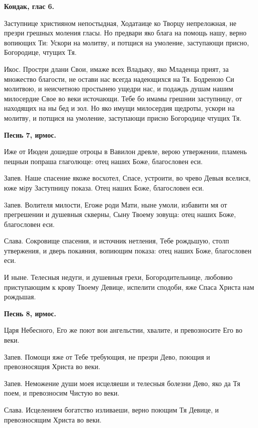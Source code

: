 \medskip


\bfseries Кондак, глас 6.\normalfont{}\nopagebreak


Заступнице християном непостыдная, Ходатаице ко Творцу непреложная, не презри грешных моления гласы. Но предвари яко блага на помощь нашу, верно вопиющих Ти: Ускори на молитву, и потщися на умоление, заступающи присно, Богородице, чтущих Тя.

Икос. Простри длани Свои, имаже всех Владыку, яко Младенца прият, за множество благости, не остави нас всегда надеющихся на Тя. Бодреною Си молитвою, и неисчетною простынею ущедри нас, и подаждь душам нашим милосердие Свое во веки источающи. Тебе бо имамы грешнии заступницу, от находящих на ны бед и зол. Но яко имущи милосердия щедроты, ускори на молитву, и потщися на умоление, заступающи присно Богородице чтущих Тя.


\medskip


\bfseries Песнь 7, ирмос.\normalfont{}\nopagebreak


Иже от Июдеи дошедше отроцы в Вавилон древле, верою утвержении, пламень пещныи попраша глаголюще: отец наших Боже,   благословен еси.

Запев. Наше спасение якоже восхотел, Спасе, устроити, во чрево Девыя вселися, юже мiру Заступницу показа. Отец наших Боже, благословен еси.

3апев. Волителя милости, Егоже роди Мати, ныне умоли, избавити мя от прегрешении и душевныя скверны, Сыну Твоему зовуща: отец наших Боже, благословен еси.

Слава. Сокровище спасения, и источник нетления, Тебе рождьшую, столп утвержения, и дверь покаяния, вопиющим показа: отец наших Боже, благословен еси.

И ныне. Телесныя недуги, и душевныя грехи, Богородительнице, любовию приступающим к крову Твоему Девице, испелити сподоби, яже Спаса Христа нам рождьшая.


\medskip


\bfseries Песнь 8, ирмос.\normalfont{}\nopagebreak


Царя Небесного, Его же поют вои ангельстии, хвалите, и превозносите Его во веки.

Запев. Помощи яже от Тебе требующия, не презри Дево, поющия и превозносящия Христа во веки.

Запев. Неможение души моея исцеляеши и телесныя болезни Дево, яко да Тя поем, и превозносим Чистую во веки.

Слава. Исцелением богатство изливаеши, верно поющим Тя Девице, и превозносящим Христа во веки.


